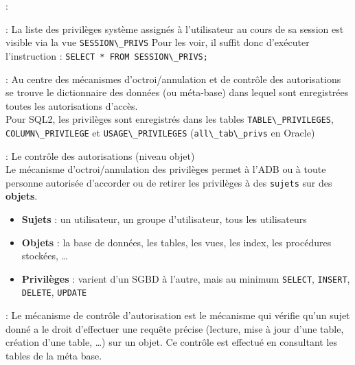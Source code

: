 \documentclass[10pt]{beamer}
\begin{document}
\begin{frame}{\secname : \subsecname}
    
\end{frame}

\begin{frame}{\secname : \subsecname}
    La liste des privilèges système assignés à l'utilisateur au cours de sa session est visible via la vue \lstinline[language=plsql]!SESSION\_PRIVS!
    Pour les voir, il suffit donc d'exécuter l'instruction :
    \lstinline[language=plsql]!SELECT * FROM SESSION\_PRIVS;!
\end{frame}
\begin{frame}{\secname : \subsecname}
    Au centre des mécanismes d'octroi/annulation et de contrôle des autorisations se trouve le dictionnaire des données (ou méta-base) dans lequel sont enregistrées toutes les autorisations d'accès.\\
    Pour SQL2, les privilèges sont enregistrés dans les tables
    \lstinline[language=plsql]!TABLE\_PRIVILEGES!, \lstinline[language=plsql]!COLUMN\_PRIVILEGE! et \lstinline[language=plsql]!USAGE\_PRIVILEGES! (\lstinline[language=plsql]!all\_tab\_privs! en Oracle)
\end{frame}

\begin{frame}{\secname : \subsecname}
    Le contrôle des autorisations (niveau objet)\\
    Le mécanisme d'octroi/annulation des privilèges permet à l'ADB ou à toute personne autorisée d'accorder ou de retirer les privilèges à des \lstinline[language=plsql]!sujets! sur des \textbf{objets}.
    \begin{itemize}
        \item \textbf{Sujets} : un utilisateur, un groupe d'utilisateur, tous les utilisateurs
        \item \textbf{Objets} : la base de données, les tables, les vues, les index, les procédures stockées, …
        \item \textbf{Privilèges} : varient d'un SGBD à l'autre, mais au minimum \lstinline[language=plsql]!SELECT!, \lstinline[language=plsql]!INSERT!, \lstinline[language=plsql]!DELETE!, \lstinline[language=plsql]!UPDATE!
    \end{itemize}
\end{frame}

\begin{frame}{\secname : \subsecname}
    Le mécanisme de contrôle d'autorisation est le mécanisme qui vérifie qu'un sujet donné a le droit d'effectuer une requête précise (lecture, mise à jour d'une table, création d'une table, …) sur un objet.  Ce contrôle est effectué en consultant les tables de la méta base.
\end{frame}
\end{document}
